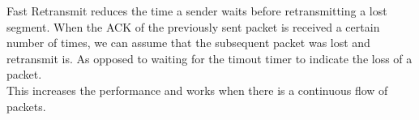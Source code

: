 Fast Retransmit reduces the time a sender waits before retransmitting a lost segment. When the ACK of the previously sent packet is received a certain number of times, we can assume that the subsequent packet was lost and retransmit is. As opposed to waiting for the timout timer to indicate the loss of a packet.\\
This increases the performance and works when there is a continuous flow of packets.
